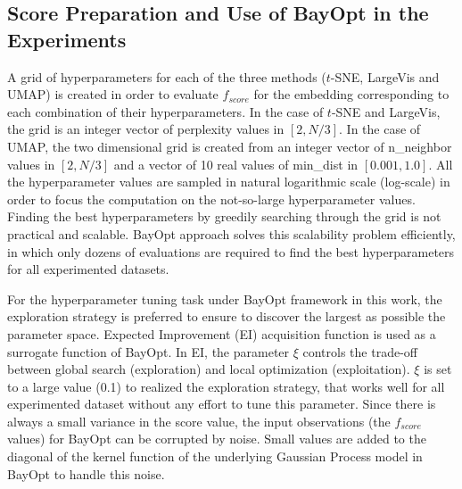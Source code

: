 \subsection{Score Preparation and Use of BayOpt in the Experiments}\label{sec:xp:proof}


A grid of hyperparameters for each of the three methods ($t$-SNE, LargeVis and UMAP) is created in order to evaluate $f_{score}$ for the embedding corresponding to each combination of their hyperparameters.
In the case of $t$-SNE and LargeVis, the grid is an integer vector of perplexity values in $[2,N/3]$.
In the case of UMAP, the two dimensional grid is created from an integer vector of {n\_neighbor} values in $[2,N/3]$ and a vector of 10 real values of {min\_dist} in $[0.001, 1.0]$.
All the hyperparameter values are sampled in natural logarithmic scale (log-scale) in order to focus the computation on the not-so-large hyperparameter values.
Finding the best hyperparameters by greedily searching through the grid is not practical and scalable.
BayOpt approach solves this scalability problem efficiently, in which only dozens of evaluations are required to find the best hyperparameters for all experimented datasets.

For the hyperparameter tuning task under BayOpt framework in this work, the exploration strategy is preferred to ensure to discover the largest as possible the parameter space.
Expected Improvement (EI) acquisition function is used as a surrogate function of BayOpt.
In EI, the parameter $\xi$ controls the trade-off between global search (exploration) and local optimization (exploitation).
$\xi$ is set to a large value (0.1) to realized the exploration strategy, that works well for all experimented dataset without any effort to tune this parameter.
Since there is always a small variance in the score value, 
the input observations (the $f_{score}$ values) for BayOpt can be corrupted by noise.
Small values are added to the diagonal of the kernel function of the underlying Gaussian Process model in BayOpt to handle this noise.

